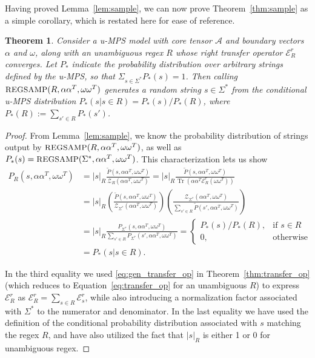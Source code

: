 \documentclass[twoside]{article}
\newtheorem*{theorem*}{Theorem}
\newcommand{\Sample}{\textsc{\small REGSAMP}}
\DeclareMathOperator{\Tr}{Tr}
\newcommand{\ER}{\mc{E}^{\scriptstyle r}}
\newcommand{\sR}{|s|_R}
\newcommand{\Pt}{\tilde{P}}
\newcommand{\alphamat}{\alpha\alpha^T}
\newcommand{\omegamat}{\omega\omega^T}
\newcommand{\mc}[1]{\mathcal{#1}}
\begin{document}
Having proved Lemma~\ref{lem:sample}, we can now prove Theorem~\ref{thm:sample} 
as a simple corollary, which is restated here for ease of reference.

\begin{theorem*}
Consider a u-MPS model with core tensor $\mc{A}$ and boundary vectors $\alpha$ and $\omega$, along with an unambiguous regex $R$ whose right transfer operator $\ER_R$ converges. Let $P_*$ indicate the probability distribution over arbitrary strings defined by the u-MPS, so that $\Sigma_{s\in\Sigma^*} P_*(s) = 1$. Then calling $\Sample(R, \alphamat, \omegamat)$ generates a random string $s \in \Sigma^*$ from the conditional u-MPS distribution $P_*(s | s \in R) = P_*(s) / P_*(R)$, where $P_*(R) := \sum_{s' \in R} P_*(s')$.
\end{theorem*}

\begin{proof}

From Lemma~\ref{lem:sample}, we know the probability distribution of strings output by $\Sample(R, \alphamat, \omegamat)$, as well as $P_*(s) = \Sample(\Sigma^*, \alphamat, \omegamat)$. This characterization lets us show
%
\begin{align*}
    P_R(s, \alphamat, \omegamat) &= \sR \frac{\Pt(s, \alphamat, \omegamat)}{\mc{Z}_R(\alphamat, \omegamat)} = \sR \frac{\Pt(s, \alphamat, \omegamat)}{\Tr(\alphamat \ER_R(\omegamat))} \\
    &= \sR \left( \frac{\Pt(s, \alphamat, \omegamat)}{\mc{Z}_{\Sigma^*}(\alphamat, \omegamat)} \right) \left( \frac{\mc{Z}_{\Sigma^*}(\alphamat, \omegamat)}{\sum_{s' \in R} \Pt(s', \alphamat, \omegamat)} \right) \\
    &= \sR \frac{P_{\Sigma^*}(s, \alphamat, \omegamat)}{\sum_{s' \in R} P_{\Sigma^*}(s', \alphamat, \omegamat)} = 
    \begin{cases}
    P_*(s) / P_*(R), &\text{if } s \in R\\
    0, &\text{otherwise}
    \end{cases} \\
    &= P_*(s | s \in R).
\end{align*}

In the third equality we used \eqref{eq:gen_transfer_op} in Theorem~\ref{thm:transfer_op} (which reduces to Equation~\eqref{eq:transfer_op} 
for an unambiguous $R$) to express $\ER_R$ as $\ER_R = \sum_{s \in R} \ER_s$, while also introducing a normalization factor associated with $\Sigma^*$ to the numerator and denominator. In the last equality we have used the definition of the conditional probability distribution associated with $s$ matching the regex $R$, and have also utilized the fact that $\sR$ is either 1 or 0 for unambiguous regex.

\end{proof}
\end{document}
